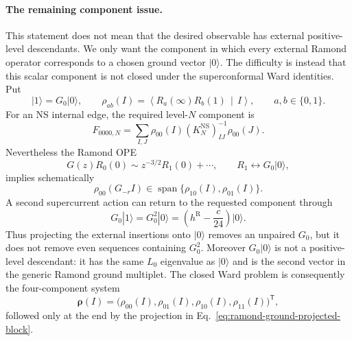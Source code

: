\documentclass[11pt]{article}
\newcommand{\NS}{\mathrm{NS}}
\newcommand{\R}{\mathrm{R}}
\begin{document}
\paragraph{The remaining component issue.}
This statement does not mean that the desired observable has external
positive-level descendants.  We only want the component in which every
external Ramond operator corresponds to a chosen ground vector
$|0\rangle$.  The difficulty is instead that this scalar component is not
closed under the superconformal Ward identities.  Put
\begin{equation}
 |1\rangle=G_0|0\rangle,\qquad
 \rho_{ab}(I)
 =\left\langle R_a(\infty)R_b(1)\,\middle|\,I\right\rangle,
 \qquad a,b\in\{0,1\}.
 \label{eq:ramond-ground-ward-vector}
\end{equation}
For an NS internal edge, the required level-$N$ component is
\begin{equation}
 F_{0000,N}
 =\sum_{I,J}\rho_{00}(I)
 \left(K_N^{\NS}\right)^{-1}_{IJ}\rho_{00}(J).
 \label{eq:ramond-ground-projected-block}
\end{equation}
Nevertheless the Ramond OPE
\begin{equation}
 G(z)R_0(0)
 \sim z^{-3/2}R_1(0)+\cdots,
 \qquad R_1\longleftrightarrow G_0|0\rangle,
 \label{eq:ramond-ground-supercurrent-ope}
\end{equation}
implies schematically
\begin{equation}
 \rho_{00}(G_{-r}I)
 \in\operatorname{span}\{\rho_{10}(I),\rho_{01}(I)\}.
 \label{eq:ramond-ground-ward-mixing}
\end{equation}
A second supercurrent action can return to the requested component through
\begin{equation}
 G_0|1\rangle
 =G_0^2|0\rangle
 =\left(h^{\R}-\frac{c}{24}\right)|0\rangle.
 \label{eq:ramond-ground-return}
\end{equation}
Thus projecting the external insertions onto $|0\rangle$ removes an
unpaired $G_0$, but it does not remove even sequences containing $G_0^2$.
Moreover $G_0|0\rangle$ is not a positive-level descendant: it has the same
$L_0$ eigenvalue as $|0\rangle$ and is the second vector in the generic
Ramond ground multiplet.  The closed Ward problem is consequently the
four-component system
\begin{equation}
 \boldsymbol{\rho}(I)
 =\bigl(\rho_{00}(I),\rho_{01}(I),
        \rho_{10}(I),\rho_{11}(I)\bigr)^{\mathsf T},
 \label{eq:ramond-ground-closed-ward-system}
\end{equation}
followed only at the end by the projection in
Eq.~\eqref{eq:ramond-ground-projected-block}.
\end{document}
